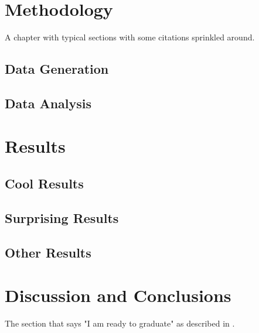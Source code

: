 
\section{Methodology}\label{sec:chp3_methods}
A chapter with typical sections with some citations sprinkled around.
\subsection{Data Generation}
\blindtext[2]
\subsection{Data Analysis}
\blindtext[2]
\section{Results}\label{sec:chp3_results}
\blindtext
\subsection{Cool Results}
\blindtext[2]
\subsection{Surprising Results}
\blindtext
\subsection{Other Results}
\blindtext
\section{Discussion and Conclusions}\label{sec:discussion}
The section that says "I am ready to graduate" as described in \citet{ruvalcaba2021}.